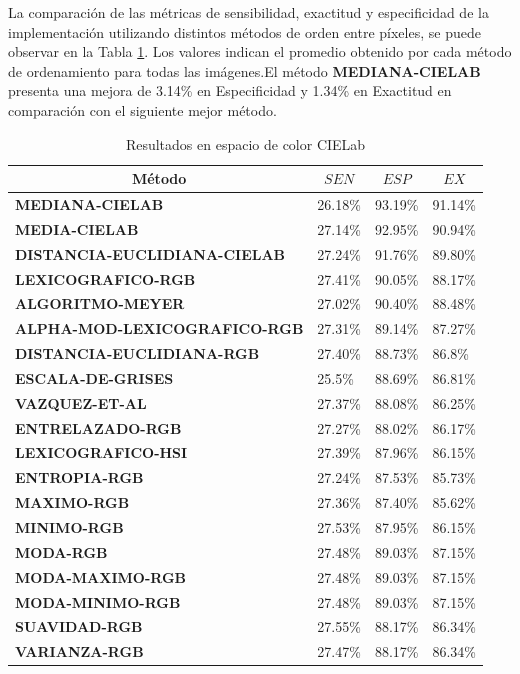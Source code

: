La comparación de las métricas de sensibilidad, exactitud y especificidad de la implementación utilizando distintos métodos de orden entre píxeles, se puede observar en la Tabla \ref{resultadosCielab}. Los valores indican el promedio obtenido por cada método de ordenamiento para todas las imágenes.El método \textbf{MEDIANA-CIELAB} presenta una mejora de 3.14\% en Especificidad y 1.34\% en Exactitud en comparación con el siguiente mejor método. 


\begin{table}[!htb]
\centering
\caption{Resultados en espacio de color CIELab}
\label{resultadosCielab}
\resizebox{15cm}{!} {
\begin{tabular}{|l|l|l|l|}
\hline
\multicolumn{1}{|c|}{\textbf{Método}} & \multicolumn{1}{c|}{\textbf{$SEN$}}& \multicolumn{1}{c|}{\textbf{$ESP$}}&  \multicolumn{1}{c|}{\textbf{$EX$}}  \\ \hline
\textbf{MEDIANA-CIELAB} & 26.18\%  & 93.19\%  & 91.14\%  \\ \hline
\textbf{MEDIA-CIELAB} & 27.14\%  & 92.95\% & 90.94\%  \\ \hline
\textbf{DISTANCIA-EUCLIDIANA-CIELAB} & 27.24\%  & 91.76\% & 89.80\% \\ \hline
\textbf{LEXICOGRAFICO-RGB} & 27.41\%  & 90.05\% & 88.17\% \\ \hline
\textbf{ALGORITMO-MEYER} & 27.02\%  & 90.40\%  & 88.48\% \\ \hline
\textbf{ALPHA-MOD-LEXICOGRAFICO-RGB} & 27.31\% & 89.14\% & 87.27\% \\ \hline
\textbf{DISTANCIA-EUCLIDIANA-RGB} & 27.40\% & 88.73\% & 86.8\%  \\ \hline
\textbf{ESCALA-DE-GRISES} & 25.5\%  & 88.69\%  & 86.81\%  \\ \hline
\textbf{VAZQUEZ-ET-AL} & 27.37\%  & 88.08\%  & 86.25\% \\ \hline
\textbf{ENTRELAZADO-RGB} & 27.27\% & 88.02\% & 86.17\% \\ \hline
\textbf{LEXICOGRAFICO-HSI} & 27.39\%  & 87.96\% & 86.15\%  \\ \hline
\textbf{ENTROPIA-RGB} & 27.24\%  & 87.53\%  & 85.73\% \\ \hline
\textbf{MAXIMO-RGB} & 27.36\%  & 87.40\%  & 85.62\%  \\ \hline
\textbf{MINIMO-RGB} & 27.53\%  & 87.95\%  & 86.15\%  \\ \hline
\textbf{MODA-RGB} & 27.48\%  & 89.03\%  & 87.15\% \\ \hline
\textbf{MODA-MAXIMO-RGB} & 27.48\%  & 89.03\% & 87.15\%   \\ \hline
\textbf{MODA-MINIMO-RGB} & 27.48\%  & 89.03\% &  87.15\%   \\ \hline
\textbf{SUAVIDAD-RGB} & 27.55\% & 88.17\%  & 86.34\% \\ \hline
\textbf{VARIANZA-RGB} & 27.47\%  & 88.17\%  & 86.34\% \\ \hline
\end{tabular}
}
\end{table}

